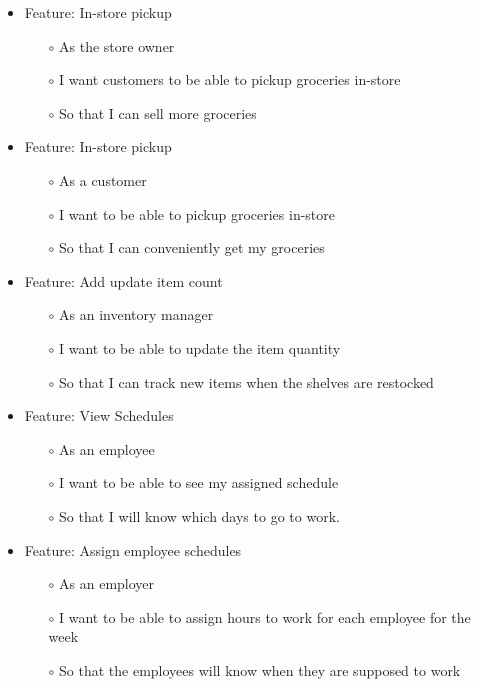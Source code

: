 \documentclass{scrreprt}
\theoremstyle{funreq}
\begin{document}
	\begin{itemize}
		\item Feature: In-store pickup
		\begin{itemize}
			\item[$\circ$]As the store owner
			\item[$\circ$]I want customers to be able to pickup groceries in-store
			\item[$\circ$]So that I can sell more groceries
		\end{itemize}
	\end{itemize}
	
	\begin{itemize}
		\item Feature: In-store pickup
		\begin{itemize}
			\item[$\circ$]As a customer
			\item[$\circ$]I want to be able to pickup groceries in-store
			\item[$\circ$]So that I can conveniently get my groceries
		\end{itemize}
	\end{itemize}
	
	\begin{itemize}
		\item Feature: Add update item count
		\begin{itemize}
			\item[$\circ$]As an inventory manager
			\item[$\circ$]I want to be able to update the item quantity
			\item[$\circ$]So that I can track new items when the shelves are restocked
		\end{itemize}
	\end{itemize}
	
	\begin{itemize}
		\item Feature: View Schedules
		\begin{itemize}
			\item[$\circ$]As an employee
			\item[$\circ$]I want to be able to see my assigned schedule
			\item[$\circ$]So that I will know which days to go to work.
		\end{itemize}
	\end{itemize}
	
	\begin{itemize}
		\item Feature: Assign employee schedules
		\begin{itemize}
			\item[$\circ$]As an employer
			\item[$\circ$]I want to be able to assign hours to work for each employee for the week
			\item[$\circ$]So that the employees will know when they are supposed to work
		\end{itemize}
	\end{itemize}
	
\end{document}
